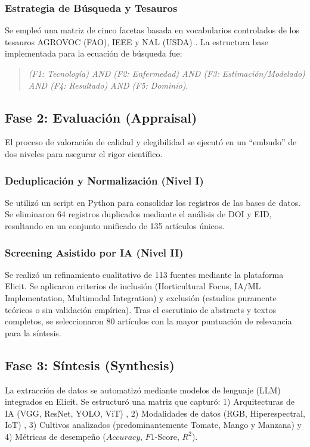 \documentclass[agriculture,article,submit,pdftex,moreauthors]{Definitions/mdpi}
\begin{document}
\subsubsection{Estrategia de Búsqueda y Tesauros}
Se empleó una matriz de cinco facetas basada en vocabularios controlados de los tesauros AGROVOC (FAO), IEEE y NAL (USDA) \citep{IEEEThesaurus2024, Agrovoc2024, NALT2024}. La estructura base implementada para la ecuación de búsqueda fue:


\begin{quote}
    \textit{(F1: Tecnología) AND (F2: Enfermedad) AND (F3: Estimación/Modelado) AND (F4: Resultado) AND (F5: Dominio)}.
\end{quote}

\subsection{Fase 2: Evaluación (Appraisal)}
El proceso de valoración de calidad y elegibilidad se ejecutó en un ``embudo'' de dos niveles para asegurar el rigor científico.

\subsubsection{Deduplicación y Normalización (Nivel I)}
Se utilizó un script en Python para consolidar los registros de las bases de datos. Se eliminaron 64 registros duplicados mediante el análisis de DOI y EID, resultando en un conjunto unificado de 135 artículos únicos.

\subsubsection{Screening Asistido por IA (Nivel II)}
Se realizó un refinamiento cualitativo de 113 fuentes mediante la plataforma Elicit. Se aplicaron criterios de inclusión (Horticultural Focus, IA/ML Implementation, Multimodal Integration) y exclusión (estudios puramente teóricos o sin validación empírica). Tras el escrutinio de abstracts y textos completos, se seleccionaron 80 artículos con la mayor puntuación de relevancia para la síntesis.

\subsection{Fase 3: Síntesis (Synthesis)}
La extracción de datos se automatizó mediante modelos de lenguaje (LLM) integrados en Elicit. Se estructuró una matriz que capturó: 1) Arquitecturas de IA (VGG, ResNet, YOLO, ViT) , 2) Modalidades de datos (RGB, Hiperespectral, IoT) , 3) Cultivos analizados (predominantemente Tomate, Mango y Manzana)  y 4) Métricas de desempeño ($Accuracy$, $F1$-Score, $R^2$).
\end{document}
